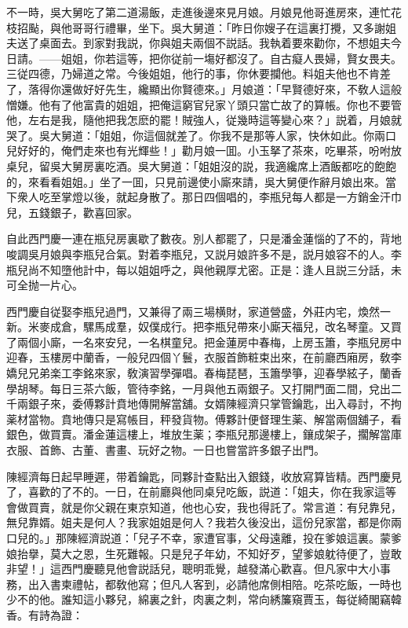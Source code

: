 不一時，吳大舅吃了第二道湯飯，走進後邊來見月娘。月娘見他哥進房來，連忙花枝招颭，與他哥哥行禮畢，坐下。吳大舅道：「昨日你嫂子在這裏打攪，又多謝姐夫送了桌面去。到家對我説，你與姐夫兩個不説話。我執着要來勸你，不想姐夫今日請。——姐姐，你若這等，把你従前一塲好都沒了。自古癡人畏婦，賢女畏夫。三従四德，乃婦道之常。今後姐姐，他行的事，你休要攔他。料姐夫他也不肯差了，落得你還做好好先生，纔顯出你賢德來。」月娘道：「早賢德好來，不敎人這般憎嫌。他有了他富貴的姐姐，把俺這窮官兒家丫頭只當亡故了的算帳。你也不要管他，左右是我，隨他把我怎麽的罷！賊強人，従幾時這等變心來？」説着，月娘就哭了。吳大舅道：「姐姐，你這個就差了。你我不是那等人家，快休如此。你兩口兒好好的，俺們走來也有光輝些！」勸月娘一囬。小玉拏了茶來，吃畢茶，吩咐放桌兒，留吳大舅房裏吃酒。吳大舅道：「姐姐沒的説，我適纔席上酒飯都吃的飽飽的，來看看姐姐。」坐了一囬，只見前邊使小廝來請，吳大舅便作辭月娘出來。當下衆人吃至掌燈以後，就起身散了。那日四個唱的，李瓶兒每人都是一方銷金汗巾兒，五錢銀子，歡喜回家。

自此西門慶一連在瓶兒房裏歇了數夜。別人都罷了，只是潘金蓮惱的了不的，背地唆調吳月娘與李瓶兒合氣。對着李瓶兒，又説月娘許多不是，説月娘容不的人。李瓶兒尚不知墮他計中，每以姐姐呼之，與他親厚尤密。正是：逢人且説三分話，未可全抛一片心。

西門慶自従娶李瓶兒過門，又兼得了兩三場横財，家道營盛，外莊内宅，煥然一新。米麥成倉，騾馬成羣，奴僕成行。把李瓶兒帶來小廝天福兒，改名琴童。又買了兩個小廝，一名來安兒，一名棋童兒。把金蓮房中春梅，上房玉簫，李瓶兒房中迎春，玉樓房中蘭香，一般兒四個丫鬟，衣服首飾粧束出來，在前廳西廂房，敎李嬌兒兄弟楽工李銘來家，敎演習學彈唱。春梅琵琶，玉簫學箏，迎春學絃子，蘭香學胡琴。每日三茶六飯，管待李銘，一月與他五兩銀子。又打開門面二間，兌出二千兩銀子來，委傅夥計賁地傳開解當舖。女婿陳經濟只掌管鑰匙，出入尋討，不拘薬材當物。賁地傳只是寫帳目，秤發貨物。傅夥計便督理生薬、解當兩個舖子，看銀色，做買賣。潘金蓮這樓上，堆放生薬；李瓶兒那邊樓上，鑲成架子，擱解當庫衣服、首飾、古董、書畫、玩好之物。一日也嘗當許多銀子出門。

陳經濟每日起早睡遲，带着鑰匙，同夥計查點出入銀錢，收放寫算皆精。西門慶見了，喜歡的了不的。一日，在前廳與他同桌兒吃飯，説道：「姐夫，你在我家這等會做買賣，就是你父親在東京知道，他也心安，我也得託了。常言道：有兒靠兒，無兒靠婿。姐夫是何人？我家姐姐是何人？我若久後没出，這份兒家當，都是你兩口兒的。」那陳經濟説道：「兒子不幸，家遭官事，父母遠離，投在爹娘這裏。蒙爹娘抬擧，莫大之恩，生死難報。只是兒子年幼，不知好歹，望爹娘躭待便了，豈敢非望！」這西門慶聽見他會説話兒，聰明乖覺，越發滿心歡喜。但凡家中大小事務，出入書柬禮帖，都敎他寫；但凡人客到，必請他席側相陪。吃茶吃飯，一時也少不的他。誰知這小夥兒，綿裏之針，肉裏之刺，常向綉簾窺賈玉，每従綺閣竊韓香。有詩為證：

